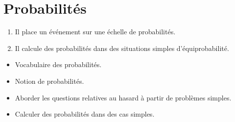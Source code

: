 \themaD
\graphicspath{{../../S10_Probabilites/Images/}}

\chapter{Probabilités}
\label{S10}

\newcommand{\sac}[1]{\begin{pspicture}(-0.5,-0.5)(2,2)
      \psline(0,0)(0,1.5)
      \psline(1.5,0)(1.5,1.5)
      \psellipse(0.75,1.5)(0.75,0.25)
      \psellipticarc(0.75,0)(0.75,0.4){180}{0}
      #1
   \end{pspicture}}


\begin{autoeval}
   \small
   \begin{enumerate}
      \item Il place un événement sur une échelle de probabilités.
      \item Il calcule des probabilités dans des situations simples d'équiprobabilité.
   \end{enumerate}
\end{autoeval}

\begin{prerequis}
   \begin{itemize}
      \item Vocabulaire des probabilités.
      \item Notion de probabilités.
      \item[\com] Aborder les questions relatives au hasard à partir de problèmes simples.
      \item[\com] Calculer des probabilités dans des cas simples.
   \end{itemize}
\end{prerequis}

\vfill

